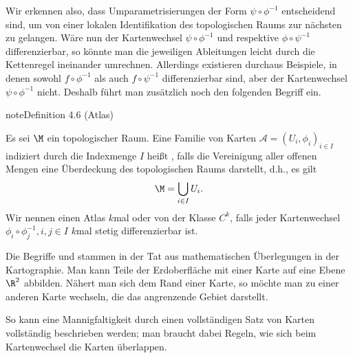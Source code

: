 \documentclass[letterpaper,10pt,german]{jupyterBook}
\begin{document}
\sphinxAtStartPar
Wir erkennen also, dass Umparametrisierungen der Form \(\psi\circ \phi^{-1}\) entscheidend sind, um von einer lokalen Identifikation des topologischen Raums zur nächsten zu gelangen.
Wäre nun der Kartenwechsel \(\psi\circ \phi^{-1}\) und respektive \(\phi\circ \psi^{-1}\) differenzierbar, so könnte man die jeweiligen Ableitungen leicht durch die Kettenregel ineinander umrechnen.
Allerdings existieren durchaus Beispiele, in denen sowohl \(f\circ\phi^{-1}\) als auch \(f\circ\psi^{-1}\) differenzierbar sind, aber der Kartenwechsel \(\psi\circ\phi^{-1}\) nicht.
Deshalb führt man zusätzlich noch den folgenden Begriff ein.
\label{manifolds/manifolds_prelim:definition-8}
\begin{sphinxadmonition}{note}{Definition 4.6 (Atlas)}



\sphinxAtStartPar
Es sei \(\M\) ein topologischer Raum.
Eine Familie von Karten \(\mathcal{A} = (U_i,\phi_i)_{i\in I}\) indiziert durch die Indexmenge \(I\) heißt , falls die Vereinigung aller offenen Mengen eine Überdeckung des topologischen Raums darstellt, d.h., es gilt
\begin{equation*}
\begin{split}\M = \bigcup_{i\in I} U_i.\end{split}
\end{equation*}
\sphinxAtStartPar
Wir nennen einen Atlas \(k\)\sphinxhyphen{}mal  oder von der Klasse \(C^k\), falls jeder Kartenwechsel \(\phi_i\circ\phi_j^{-1}, i,j\in I\) \(k\)\sphinxhyphen{}mal stetig differenzierbar ist.
\end{sphinxadmonition}

\sphinxAtStartPar
Die Begriffe  und  stammen in der Tat aus mathematischen Überlegungen in der Kartographie.
Man kann Teile der Erdoberfläche mit einer Karte auf eine Ebene \(\R^2\) abbilden.
Nähert man sich dem Rand einer Karte, so möchte man zu einer anderen Karte wechseln, die das angrenzende Gebiet darstellt.

\sphinxAtStartPar
So kann eine Mannigfaltigkeit durch einen vollständigen Satz von Karten vollständig beschrieben werden; man braucht dabei Regeln, wie sich beim Kartenwechsel die Karten überlappen.
\end{document}
